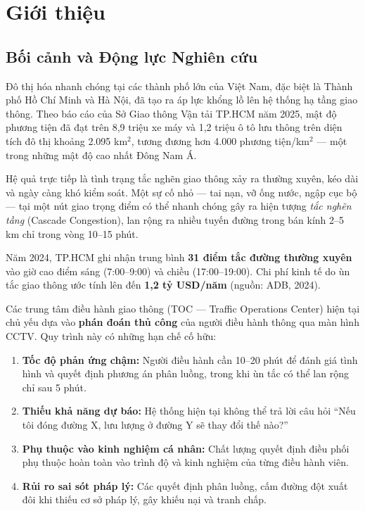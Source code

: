\chapter{Giới thiệu}

\section{Bối cảnh và Động lực Nghiên cứu}

Đô thị hóa nhanh chóng tại các thành phố lớn của Việt Nam, đặc biệt là Thành phố Hồ Chí Minh và Hà Nội, đã tạo ra áp lực khổng lồ lên hệ thống hạ tầng giao thông. Theo báo cáo của Sở Giao thông Vận tải TP.HCM năm 2025, mật độ phương tiện đã đạt trên 8,9 triệu xe máy và 1,2 triệu ô tô lưu thông trên diện tích đô thị khoảng 2.095 km$^2$, tương đương hơn 4.000 phương tiện/km$^2$ --- một trong những mật độ cao nhất Đông Nam Á.

Hệ quả trực tiếp là tình trạng tắc nghẽn giao thông xảy ra thường xuyên, kéo dài và ngày càng khó kiểm soát. Một sự cố nhỏ --- tai nạn, vỡ ống nước, ngập cục bộ --- tại một nút giao trọng điểm có thể nhanh chóng gây ra hiện tượng \textit{tắc nghẽn tầng} (Cascade Congestion), lan rộng ra nhiều tuyến đường trong bán kính 2--5 km chỉ trong vòng 10--15 phút.

\begin{tcolorbox}[warnbox]
Năm 2024, TP.HCM ghi nhận trung bình \textbf{31 điểm tắc đường thường xuyên} vào giờ cao điểm sáng (7:00--9:00) và chiều (17:00--19:00). Chi phí kinh tế do ùn tắc giao thông ước tính lên đến \textbf{1,2 tỷ USD/năm} (nguồn: ADB, 2024).
\end{tcolorbox}

Các trung tâm điều hành giao thông (TOC --- Traffic Operations Center) hiện tại chủ yếu dựa vào \textbf{phán đoán thủ công} của người điều hành thông qua màn hình CCTV. Quy trình này có những hạn chế cố hữu:

\begin{enumerate}[leftmargin=1.5cm, itemsep=4pt]
  \item \textbf{Tốc độ phản ứng chậm:} Người điều hành cần 10--20 phút để đánh giá tình hình và quyết định phương án phân luồng, trong khi ùn tắc có thể lan rộng chỉ sau 5 phút.
  \item \textbf{Thiếu khả năng dự báo:} Hệ thống hiện tại không thể trả lời câu hỏi ``Nếu tôi đóng đường X, lưu lượng ở đường Y sẽ thay đổi thế nào?''
  \item \textbf{Phụ thuộc vào kinh nghiệm cá nhân:} Chất lượng quyết định điều phối phụ thuộc hoàn toàn vào trình độ và kinh nghiệm của từng điều hành viên.
  \item \textbf{Rủi ro sai sót pháp lý:} Các quyết định phân luồng, cấm đường đột xuất đôi khi thiếu cơ sở pháp lý, gây khiếu nại và tranh chấp.
\end{enumerate}

